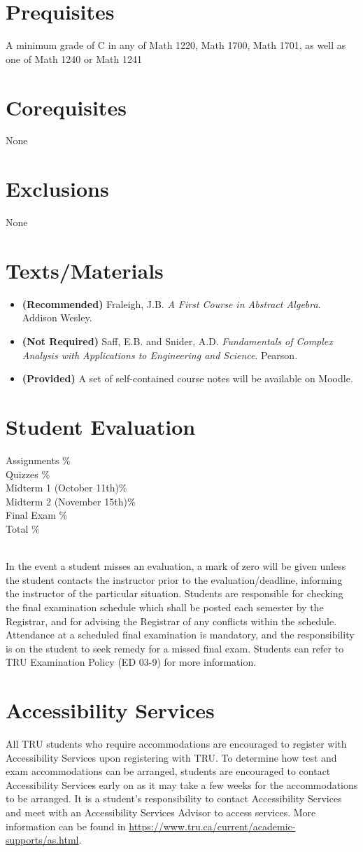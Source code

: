 \documentclass[10pt]{trumathoutline}
\newcommand{\courseprerequisites}{
A minimum grade of C in any of Math 1220, Math 1700, Math 1701, as well as one of Math 1240 or Math 1241}
\newcommand{\coursecorequisites}{None}
\newcommand{\courseexclusions}{None}
\newcommand{\textsmaterials}{
\begin{itemize}
\item \textbf{(Recommended)} Fraleigh, J.B. \emph{A First Course in Abstract Algebra}. Addison Wesley.
\item \textbf{(Not Required)} Saff, E.B. and Snider, A.D. \emph{Fundamentals of Complex Analysis with Applications to Engineering and Science}. Pearson.
\item \textbf{(Provided)} A set of self-contained course notes will be available on Moodle.
\end{itemize}
}
\newcommand{\evaluation}{
	Assignments \dotfill	20\%\\
	Quizzes \dotfill 		15\%\\
	Midterm 1 (October 11th)\dotfill	15\%\\
	Midterm 2 (November 15th)\dotfill 	15\%\\
	Final Exam \dotfill	35\%\\
	Total	\dotfill 		100\%
}
\begin{document}
\section*{Prequisites}
\courseprerequisites

\section*{Corequisites}
\coursecorequisites

\section*{Exclusions}
\courseexclusions

\section*{Texts/Materials}
\textsmaterials

\section*{Student Evaluation}
\begin{minipage}{\textwidth}
\evaluation
\end{minipage}\\


In the event a student misses an evaluation, a mark of zero will be given unless the student contacts the instructor prior to the evaluation/deadline, informing the instructor of the particular situation. Students are responsible for checking the final examination schedule which shall be posted each semester by the Registrar, and for advising the Registrar of any conflicts within the schedule. Attendance at a scheduled final examination is mandatory, and the responsibility is on the student to seek remedy for a missed final exam. Students can refer to TRU Examination Policy (ED 03-9) for more information.


\section*{Accessibility Services}
All TRU students who require accommodations are encouraged to register with Accessibility Services upon registering with TRU. To determine how test and exam accommodations can be arranged, students are encouraged to contact Accessibility Services early on as it may take a few weeks for the accommodations to be arranged. It is a student's responsibility to contact Accessibility Services and meet with an Accessibility Services Advisor to access services. More information can be found in
\href{https://www.tru.ca/current/academic-supports/as.html}{https://www.tru.ca/current/academic-supports/as.html}.
\end{document}
